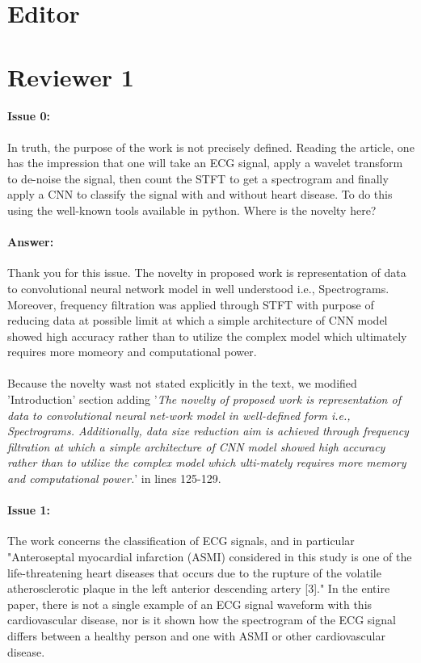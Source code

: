 \documentclass{article}
\begin{document}
\section{Editor}

\section{Reviewer 1}

\paragraph{Issue 0:}
\begin{displayquote}
In truth, the purpose of the work is not precisely defined. Reading the article, one has the impression that one will take an ECG signal, apply a wavelet transform to de-noise the signal, then count the STFT to get a spectrogram and finally apply a CNN to classify the signal with and without heart disease. To do this using the well-known tools available in python. Where is the novelty here?
\end{displayquote}

\paragraph{Answer:}
Thank you for this issue. The novelty in proposed work is representation of data to convolutional neural network model in well understood i.e., Spectrograms. Moreover,  frequency filtration was applied through STFT with purpose of reducing data at possible limit at which a simple architecture of CNN model showed high accuracy rather than to utilize the complex model which ultimately requires more momeory and computational power.\\\\

Because the novelty wast not stated explicitly in the text, we modified 'Introduction' section adding '\textit{The novelty of proposed work is representation of data to convolutional neural net-work model in well-defined form i.e., Spectrograms. Additionally, data size reduction aim is achieved through frequency filtration at which a simple architecture of CNN model showed high accuracy rather than to utilize the complex model which ulti-mately requires more memory and computational power.}' in lines 125-129.

\paragraph{Issue 1:}
\begin{displayquote}
The work concerns the classification of ECG signals, and in particular "Anteroseptal myocardial infarction (ASMI) considered in this study is one of the life-threatening heart diseases that occurs due to the rupture of the volatile atherosclerotic plaque in the left anterior descending artery [3]." In the entire paper, there is not a single example of an ECG signal waveform with this cardiovascular disease, nor is it shown how the spectrogram of the ECG signal differs between a healthy person and one with ASMI or other cardiovascular disease. 
\end{displayquote}
\end{document}
